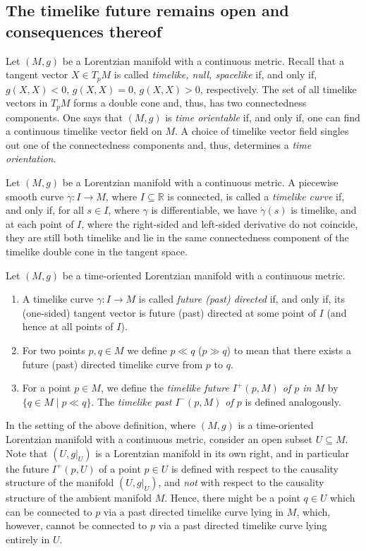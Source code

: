 \documentclass[reqno]{article}
\newcommand{\R}{\mathbb{R}}
\begin{document}
\subsection{The timelike future remains open and consequences thereof}

Let $(M,g)$ be a Lorentzian manifold with a continuous metric. Recall that a tangent vector $X \in T_pM$ is called \emph{timelike, null, spacelike} if, and only if,  $g(X,X) < 0$, $g(X,X) = 0$, $g(X,X) >0$, respectively. The set of all timelike vectors in $T_pM$ forms a double cone and, thus, has two connectedness components. One says that $(M,g)$ is \emph{time orientable} if, and only if, one can find a continuous timelike vector field on $M$. A choice of timelike vector field singles out one of the connectedness components and, thus, determines a \emph{time orientation}.

\begin{definition}
Let $(M,g)$ be a Lorentzian manifold with a continuous metric. A piecewise smooth curve $\gamma : I \to M$, where $I \subseteq \R$ is connected, is called a \emph{timelike curve} if, and only if, for all $s \in I$, where $\gamma$ is differentiable, we have $\dot{\gamma}(s)$ is timelike, and at each point of $I$, where the right-sided and left-sided derivative do not coincide, they are still both timelike and lie in the same connectedness component of the timelike double cone in the tangent space. 
\end{definition}

\begin{definition}
Let $(M,g)$ be a time-oriented Lorentzian manifold with a continuous metric.
\begin{enumerate}
\item A timelike curve $\gamma : I \to M$ is called \emph{future (past) directed} if, and only if, its (one-sided) tangent vector is future (past) directed at some point of $I$ (and hence at all points of $I$).
\item For two points $p,q \in M$ we define $p \ll q$ ($p \gg q$) to mean that there exists a future (past) directed timelike curve from $p$ to $q$.
\item For a point $p \in M$, we define the \emph{timelike future $I^+(p, M)$ of $p$ in $M$} by $\{ q \in M \; | \; p \ll q \}$. The \emph{timelike past $I^-(p, M)$ of $p$} is defined analogously.
\end{enumerate}
\end{definition}

\begin{remark}
In the setting of the above definition, where $(M,g)$ is a time-oriented Lorentzian manifold with a continuous metric, consider an open subset $U \subseteq M$. Note that $(U,g|_U)$ is a Lorentzian manifold in its own right, and in particular the future $I^+(p,U)$ of a point $p \in U$ is defined with respect to the causality structure of the manifold $(U,g|_U)$, and \emph{not} with respect to the causality structure of the ambient manifold $M$. Hence, there might be a point $q \in U$ which can be connected to $p$ via a past directed timelike curve lying in $M$, which, however, cannot be connected to $p$ via a past directed timelike curve lying entirely in $U$.
\end{remark}
\end{document}
